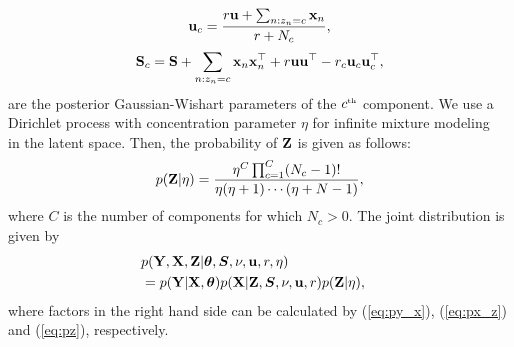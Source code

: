 \begin{align}
{\bf{u}}_{c}=\frac{r{\bf{u}}+\sum_{n:z_{n}=c}{\bf{x}}_{n}}{r+N_{c}}, 
\nonumber
\end{align}
\begin{align}
\mathbf{S}_{c}=\mathbf{S}+\sum_{n:z_{n}=c}{\bf{x}}_{n}{\bf{x}}_{n}^{\top}+r{\bf{u}}{\bf{u}}^{\top}
-r_{c}{\bf{u}}_{c}{\bf{u}}_{c}^{\top},
\end{align}
are the posterior Gaussian-Wishart parameters of the $c^{\text{\tiny th}}$ component.
We use a Dirichlet process with concentration parameter $\eta$
for infinite mixture modeling~\cite{maceachern1998estimating} 
in the latent space.
Then, the probability of $\mathbf{Z}$ is given as follows:
\begin{align}
p(\mathbf{Z}|\eta) = 
\frac{\eta^{C}\prod_{c=1}^{C}(N_{c}-1)!}
{\eta(\eta+1)\cdots(\eta+N-1)},
\label{eq:pz}
\end{align}
where $C$ is the number of components for which $N_{c}>0$.
The joint distribution is given by
\begin{align}
\lefteqn{p(\vY,\vX,\vZ|\bm{\theta},\bm{S},\nu,\vu,r,\eta)}
\nonumber \\
& = p(\vY|\vX,\bm{\theta})
p(\vX|\vZ,\bm{S},\nu,\vu,r)p(\vZ|\eta),
\label{eq:joint}
\end{align}
where factors in the right hand side can be calculated by
(\ref{eq:py_x}), (\ref{eq:px_z}) and (\ref{eq:pz}), respectively.

